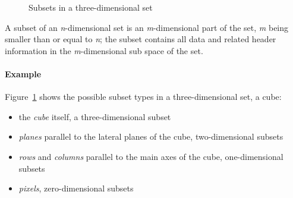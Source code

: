 \begin{figure}[hb]
\caption{Subsets in a three-dimensional set}

\label{fig:subsets}

\end{figure}

\clearpage

A subset of an {\em n}-dimensional set is an {\em m}-dimensional part of
the set, {\em m} being smaller than or equal to {\em n}; the subset
contains all data and related header information in the {\em
m}-dimensional sub space of the set. 

\paragraph*{Example}

Figure~\ref{fig:subsets} shows the possible subset types in a
three-dimensional set, a cube:

\begin{itemize}

\item the {\em cube} itself, a three-dimensional subset

\item {\em planes} parallel to the lateral planes of the cube, two-dimensional
subsets

\item {\em rows} and {\em columns} parallel to the main axes of the
cube, one-dimensional subsets

\item {\em pixels}, zero-dimensional subsets

\end{itemize}

